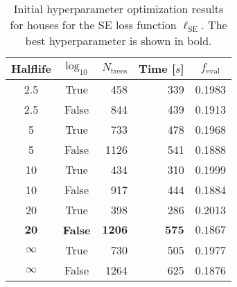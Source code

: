  \begin{table}[h!]
  \begin{tabular}{@{}ccrrc@{}}
    Halflife & $\log_{10}$ & $N_\mathrm{trees}$ & Time [$s$] & $f_\mathrm{eval}$ \\
    \midrule
    \num{2.5} & True & \num{458} & \num{339} & \num{0.1983} \\
    \num{2.5} & False & \num{844} & \num{439} & \num{0.1913} \\
    \num{5} & True & \num{733} & \num{478} & \num{0.1968} \\
    \num{5} & False & \num{1126} & \num{541} & \num{0.1888} \\
    \num{10} & True & \num{434} & \num{310} & \num{0.1999} \\
    \num{10} & False & \num{917} & \num{444} & \num{0.1884} \\
    \num{20} & True & \num{398} & \num{286} & \num{0.2013} \\
    $\mathbf{20}$ & \textbf{False} & $\mathbf{1206}$ & $\mathbf{575}$ & $\mathbf{0.1867}$ \\
    $\infty$ & True & \num{730} & \num{505} & \num{0.1977} \\
    $\infty$ & False & \num{1264} & \num{625} & \num{0.1876} \\
  \end{tabular}
  \caption[Initial Hyperparameter Optimization Results for Houses -- SE Loss Function]{\label{tab:h:HPO_initial_Rmse-villa-appendix}Initial hyperparameter optimization results for houses for the SE loss function $\ell_\mathrm{SE}$. The best hyperparameter is shown in bold.}
\end{table}


